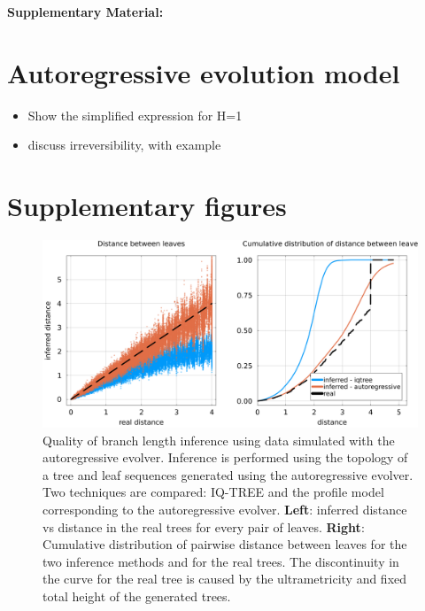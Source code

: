 \begin{center}
\textbf{\large Supplementary Material: \papertitle}
\end{center}

\section{Autoregressive evolution model} %
\label{sec:autoregressive_evolution_model}

\begin{itemize}
	\item Show the simplified expression for H=1
	\item discuss irreversibility, with example
\end{itemize}


\section{Supplementary figures} %
\label{sec:supplementary_figures}

\begin{figure}[h]
	\centering
	\includegraphics[width=.75\textwidth]{figures/SI/branch_length_reconstruction_arnet_PF00072.png}
	\caption{
		Quality of branch length inference using data simulated with the autoregressive evolver. 
		Inference is performed using the topology of a tree and leaf sequences generated using the autoregressive evolver. 
		Two techniques are compared: IQ-TREE and the profile model corresponding to the autoregressive evolver. 
		\textbf{Left}: inferred distance vs distance in the real trees for every pair of leaves. 
		\textbf{Right}: Cumulative distribution of pairwise distance between leaves for the two inference methods and for the real trees. 
		The discontinuity in the curve for the real tree is caused by the ultrametricity and fixed total height of the generated trees. 
	}
	\label{sfig:branch_length_reconstruction}
\end{figure}


